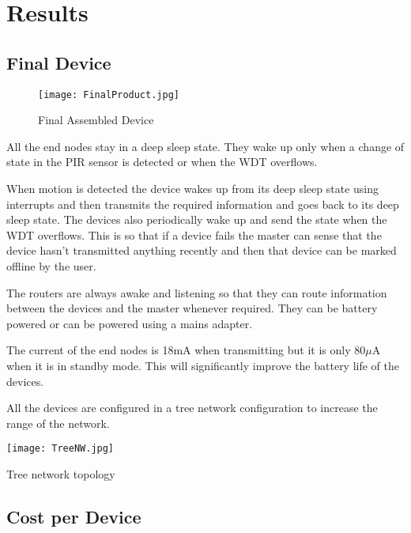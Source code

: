 \chapter{Results}

\section{Final Device}

\begin{figure}[ht]
	\begin{center}
		
		\texttt{[image: FinalProduct.jpg]}
		
		\caption{Final Assembled Device}
		
		\end{center}
\end{figure}

All the end nodes stay in a deep sleep state. They wake up only when a change of state in the PIR sensor is detected or when the WDT overflows. 

When motion is detected the device wakes up from its deep sleep state using interrupts and then transmits the required information and goes back to its deep sleep state. 
The devices also periodically wake up and send the state when the WDT overflows. This is so that if a device fails the master can sense that the device hasn't transmitted anything recently and then that device can be marked offline by the user.

The routers are always awake and listening so that they can route information between the devices and the master whenever required. They can be battery powered or can be powered using a mains adapter.

The current of the end nodes is 18mA when transmitting but it is only 80$\mu$A when it is in standby mode. This will significantly improve the battery life of the devices.

All the devices are configured in a tree network configuration to increase the range of the network.
\begin{center}
	\texttt{[image: TreeNW.jpg]}
	
	Tree network topology
\end{center}

\section{Cost per Device}

